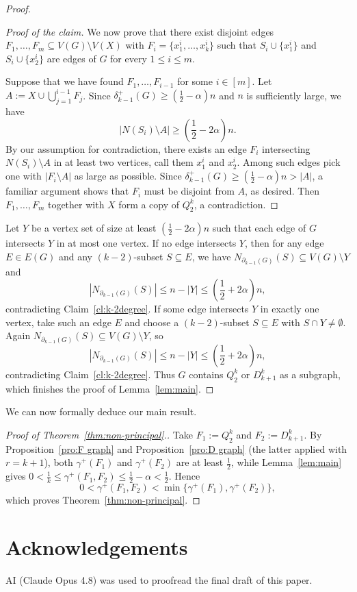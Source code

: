 \documentclass[11pt]{article}
\newenvironment{poc}{\begin{proof}[Proof of the claim]\renewcommand*{\qedsymbol}{$\blacksquare$}}{\end{proof}}
\begin{document}
\begin{proof}
\begin{poc}
    We now prove that there exist disjoint edges $F_1,\dots,F_m\subseteq V(G)\setminus V(X)$ with $F_i=\{x_1^i,\dots,x_k^i\}$ such that $S_i\cup\{x_1^i\}$ and $S_i\cup\{x_2^i\}$ are edges of $G$ for every $1\le i\le m$.
    
    Suppose that we have found $F_1,\dots,F_{i-1}$ for some $i\in[m]$. Let $A:=X\cup\bigcup_{j=1}^{i-1}F_j$. Since $\delta_{k-1}^+(G)\ge\left(\frac{1}{2}-\alpha\right)n$ and $n$ is sufficiently large, we have
    \[
    \left|N(S_i)\setminus A\right|\ge\left(\frac{1}{2}-2\alpha\right)n.
    \]
    By our assumption for contradiction, there exists an edge $F_i$ intersecting $N(S_i)\setminus A$ in at least two vertices, call them $x_1^i$ and $x_2^i$. Among such edges pick one with $|F_i\setminus A|$ as large as possible. Since $\delta_{k-1}^+(G)\ge\left(\frac{1}{2}-\alpha\right)n>|A|$, a familiar argument shows that $F_i$ must be disjoint from $A$, as desired.
    Then $F_1,\dots,F_m$ together with $X$ form a copy of $Q_2^k$, a contradiction.
   \end{poc}
   Let $Y$ be a vertex set of size at least $\left(\frac{1}{2}-2\alpha\right)n$ such that each edge of $G$ intersects $Y$ in at most one vertex.
   If no edge intersects $Y$, then for any edge $E\in E(G)$ and any $(k-2)$-subset $S\subseteq E$, we have $N_{\partial_{k-1}(G)}(S)\subseteq V(G)\setminus Y$ and
   \[
   |N_{\partial_{k-1}(G)}(S)|\le n-|Y|\le\left(\frac{1}{2}+2\alpha\right)n,
   \]
   contradicting Claim~\ref{cl:k-2degree}.
   If some edge intersects $Y$ in exactly one vertex, take such an edge $E$ and choose a $(k-2)$-subset $S\subseteq E$ with $S\cap Y\neq\emptyset$. Again $N_{\partial_{k-1}(G)}(S)\subseteq V(G)\setminus Y$, so
   \[
   |N_{\partial_{k-1}(G)}(S)|\le n-|Y|\le\left(\frac{1}{2}+2\alpha\right)n,
   \]
   contradicting Claim~\ref{cl:k-2degree}. 
   Thus $G$ contains $Q_2^k$ or $D_{k+1}^k$ as a subgraph, which finishes the proof of Lemma~\ref{lem:main}.
\end{proof}

We can now formally deduce our main result. 

\begin{proof}[Proof of Theorem~\ref{thm:non-principal}.] Take $F_1:=Q_2^k$ and $F_2:=D_{k+1}^k$. By Proposition~\ref{pro:F graph} and Proposition~\ref{pro:D graph} (the latter applied with $r=k+1$), both $\gamma^+(F_1)$ and $\gamma^+(F_2)$ are at least $\frac{1}{2}$, while Lemma~\ref{lem:main} gives $0<\frac{1}{k}\le\gamma^+(F_1,F_2)\le\frac{1}{2}-\alpha<\frac{1}{2}$. Hence
\[
0<\gamma^+(F_1,F_2)<\min\{\gamma^+(F_1),\gamma^+(F_2)\},
\]
which proves Theorem~\ref{thm:non-principal}.\end{proof}

\section*{Acknowledgements}
AI (Claude Opus 4.8) was used to proofread the final draft of this paper.

\end{document}
